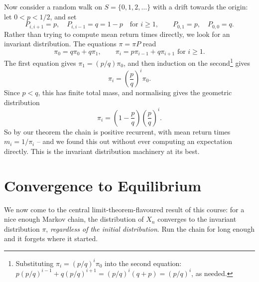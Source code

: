 \documentclass[a4paper]{scrartcl}
\begin{document}
\begin{example}
	Now consider a random walk on $S = \{0, 1, 2, \dots\}$ with a drift towards the origin: let $0 < p < 1/2$, and set
	$$
	P_{i, i + 1} = p, \quad P_{i, i - 1} = q = 1 - p \quad \text{for } i \geq 1, \qquad P_{0, 1} = p, \quad P_{0, 0} = q.
	$$
	Rather than trying to compute mean return times directly, we look for an invariant distribution. The equations $\pi = \pi P$ read
	$$
	\pi_0 = q\pi_0 + q \pi_1, \qquad \pi_i = p\pi_{i - 1} + q\pi_{i + 1} \text{ for } i \geq 1.
	$$
	The first equation gives $\pi_1 = (p/q)\pi_0$, and then induction on the second\footnote{Substituting $\pi_i = (p/q)^i \pi_0$ into the second equation: $p (p/q)^{i-1} + q(p/q)^{i + 1} = (p/q)^i (q + p) = (p/q)^i$, as needed.} gives
	$$
	\pi_i = \left(\frac{p}{q}\right)^i \pi_0.
	$$
	Since $p < q$, this has finite total mass, and normalising gives the geometric distribution
	$$
	\pi_i = \left(1 - \frac{p}{q}\right)\left(\frac{p}{q}\right)^i.
	$$
	So by our theorem the chain is positive recurrent, with mean return times $m_i = 1/\pi_i$ -- and we found this out without ever computing an expectation directly. This is the invariant distribution machinery at its best.
\end{example}

\section{Convergence to Equilibrium}

We now come to the central limit-theorem-flavoured result of this course: for a nice enough Markov chain, the distribution of $X_n$ converges to the invariant distribution $\pi$, \emph{regardless of the initial distribution}. Run the chain for long enough and it forgets where it started.
\end{document}
